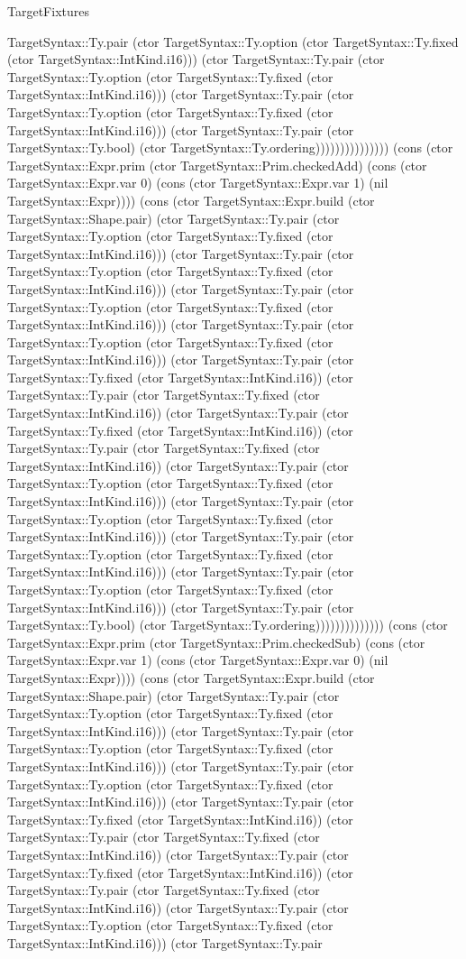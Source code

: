 \begin{lexlean}{TargetFixtures}
\begin{semanticmodule}
{TargetSyntax::Ty.pair (ctor TargetSyntax::Ty.option (ctor TargetSyntax::Ty.fixed (ctor TargetSyntax::IntKind.i16))) (ctor TargetSyntax::Ty.pair (ctor TargetSyntax::Ty.option (ctor TargetSyntax::Ty.fixed (ctor TargetSyntax::IntKind.i16))) (ctor TargetSyntax::Ty.pair (ctor TargetSyntax::Ty.option (ctor TargetSyntax::Ty.fixed (ctor TargetSyntax::IntKind.i16))) (ctor TargetSyntax::Ty.pair (ctor TargetSyntax::Ty.bool) (ctor TargetSyntax::Ty.ordering))))))))))))))) (cons (ctor TargetSyntax::Expr.prim (ctor TargetSyntax::Prim.checkedAdd) (cons (ctor TargetSyntax::Expr.var 0) (cons (ctor TargetSyntax::Expr.var 1) (nil TargetSyntax::Expr)))) (cons (ctor TargetSyntax::Expr.build (ctor TargetSyntax::Shape.pair) (ctor TargetSyntax::Ty.pair (ctor TargetSyntax::Ty.option (ctor TargetSyntax::Ty.fixed (ctor TargetSyntax::IntKind.i16))) (ctor TargetSyntax::Ty.pair (ctor TargetSyntax::Ty.option (ctor TargetSyntax::Ty.fixed (ctor TargetSyntax::IntKind.i16))) (ctor TargetSyntax::Ty.pair (ctor TargetSyntax::Ty.option (ctor TargetSyntax::Ty.fixed (ctor TargetSyntax::IntKind.i16))) (ctor TargetSyntax::Ty.pair (ctor TargetSyntax::Ty.option (ctor TargetSyntax::Ty.fixed (ctor TargetSyntax::IntKind.i16))) (ctor TargetSyntax::Ty.pair (ctor TargetSyntax::Ty.fixed (ctor TargetSyntax::IntKind.i16)) (ctor TargetSyntax::Ty.pair (ctor TargetSyntax::Ty.fixed (ctor TargetSyntax::IntKind.i16)) (ctor TargetSyntax::Ty.pair (ctor TargetSyntax::Ty.fixed (ctor TargetSyntax::IntKind.i16)) (ctor TargetSyntax::Ty.pair (ctor TargetSyntax::Ty.fixed (ctor TargetSyntax::IntKind.i16)) (ctor TargetSyntax::Ty.pair (ctor TargetSyntax::Ty.option (ctor TargetSyntax::Ty.fixed (ctor TargetSyntax::IntKind.i16))) (ctor TargetSyntax::Ty.pair (ctor TargetSyntax::Ty.option (ctor TargetSyntax::Ty.fixed (ctor TargetSyntax::IntKind.i16))) (ctor TargetSyntax::Ty.pair (ctor TargetSyntax::Ty.option (ctor TargetSyntax::Ty.fixed (ctor TargetSyntax::IntKind.i16))) (ctor TargetSyntax::Ty.pair (ctor TargetSyntax::Ty.option (ctor TargetSyntax::Ty.fixed (ctor TargetSyntax::IntKind.i16))) (ctor TargetSyntax::Ty.pair (ctor TargetSyntax::Ty.bool) (ctor TargetSyntax::Ty.ordering)))))))))))))) (cons (ctor TargetSyntax::Expr.prim (ctor TargetSyntax::Prim.checkedSub) (cons (ctor TargetSyntax::Expr.var 1) (cons (ctor TargetSyntax::Expr.var 0) (nil TargetSyntax::Expr)))) (cons (ctor TargetSyntax::Expr.build (ctor TargetSyntax::Shape.pair) (ctor TargetSyntax::Ty.pair (ctor TargetSyntax::Ty.option (ctor TargetSyntax::Ty.fixed (ctor TargetSyntax::IntKind.i16))) (ctor TargetSyntax::Ty.pair (ctor TargetSyntax::Ty.option (ctor TargetSyntax::Ty.fixed (ctor TargetSyntax::IntKind.i16))) (ctor TargetSyntax::Ty.pair (ctor TargetSyntax::Ty.option (ctor TargetSyntax::Ty.fixed (ctor TargetSyntax::IntKind.i16))) (ctor TargetSyntax::Ty.pair (ctor TargetSyntax::Ty.fixed (ctor TargetSyntax::IntKind.i16)) (ctor TargetSyntax::Ty.pair (ctor TargetSyntax::Ty.fixed (ctor TargetSyntax::IntKind.i16)) (ctor TargetSyntax::Ty.pair (ctor TargetSyntax::Ty.fixed (ctor TargetSyntax::IntKind.i16)) (ctor TargetSyntax::Ty.pair (ctor TargetSyntax::Ty.fixed (ctor TargetSyntax::IntKind.i16)) (ctor TargetSyntax::Ty.pair (ctor TargetSyntax::Ty.option (ctor TargetSyntax::Ty.fixed (ctor TargetSyntax::IntKind.i16))) (ctor TargetSyntax::Ty.pair }
\end{semanticmodule}
\end{lexlean}

